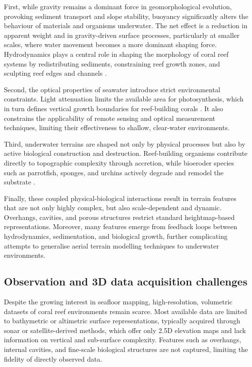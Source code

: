 First, while gravity remains a dominant force in geomorphological evolution, provoking sediment transport and slope stability, buoyancy significantly alters the behaviour of materials and organisms underwater. The net effect is a reduction in apparent weight and in gravity-driven surface processes, particularly at smaller scales, where water movement becomes a more dominant shaping force. Hydrodynamics plays a central role in shaping the morphology of coral reef systems by redistributing sediments, constraining reef growth zones, and sculpting reef edges and channels \cite{Lowe2015}.

Second, the optical properties of seawater introduce strict environmental constraints. Light attenuation limits the available area for photosynthesis, which in turn defines vertical growth boundaries for reef-building corals \cite{Huston1985}. It also constrains the applicability of remote sensing and optical measurement techniques, limiting their effectiveness to shallow, clear-water environments.

Third, underwater terrains are shaped not only by physical processes but also by active biological construction and destruction. Reef-building organisms contribute directly to topographic complexity through accretion, while bioeroder species such as parrotfish, sponges, and urchins actively degrade and remodel the substrate \cite{Perry2013}. %

Finally, these coupled physical-biological interactions result in terrain features that are not only highly complex, but also scale-dependent and dynamic. Overhangs, cavities, and porous structures restrict standard heightmap-based representations. Moreover, many features emerge from feedback loops between hydrodynamics, sedimentation, and biological growth, further complicating attempts to generalise aerial terrain modelling techniques to underwater environments. %


\subsection{Observation and 3D data acquisition challenges}
Despite the growing interest in seafloor mapping, high-resolution, volumetric datasets of coral reef environments remain scarce. Most available data are limited to bathymetric or altimetric surface representations, typically acquired through sonar or satellite-derived methods, which offer only 2.5D elevation maps and lack information on vertical and sub-surface complexity. Features such as overhangs, internal cavities, and fine-scale biological structures are not captured, limiting the fidelity of directly observed data.

